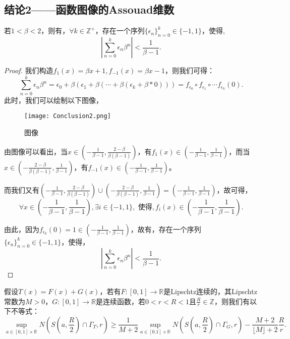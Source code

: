 \subsection{结论2——函数图像的Assouad维数}

\begin{lemma}
      若$1<\beta<2$，则有，$\forall k\in\mathbb{Z}^+$，存在一个序列$\{\epsilon_n\}_{n=0}^k\in\{-1,1\}$，使得,
      $$
            |\sum_{n=0}^k\epsilon_n\beta^n|<\frac{1}{\beta-1}.
      $$
\end{lemma}

\begin{proof}
      我们构造$f_1(x)=\beta x+1,f_{-1}(x)=\beta x -1$，则我们可得：
      $$
            \sum_{n=0}^k\epsilon_n\beta^n=\epsilon_0+\beta(\epsilon_1+\beta(\cdots+\beta(\epsilon_k+\beta*0)))=f_{\epsilon_0}\circ f_{\epsilon_1}\circ \cdots f_{\epsilon_k}(0).
      $$
      此时，我们可以绘制以下图像，
      \begin{figure*}[htbp]
            \centering
            \texttt{[image: Conclusion2.png]}
            \caption{图像}
            \label{fig:C1onclusion2}
      \end{figure*}

      由图像可以看出，当$x\in(-\frac{1}{\beta-1},\frac{2-\beta}{\beta(\beta-1)})$，有$f_1(x)\in(-\frac{1}{\beta-1},\frac{1}{\beta-1})$，而当$x\in(-\frac{2-\beta}{\beta(\beta-1)},\frac{1}{\beta-1})$，有$f_{-1}(x)\in(-\frac{1}{\beta-1},\frac{1}{\beta-1})$。

      而我们又有$(-\frac{1}{\beta-1},\frac{2-\beta}{\beta(\beta-1)})\cup(-\frac{2-\beta}{\beta(\beta-1)},\frac{1}{\beta-1})=(-\frac{1}{\beta-1},\frac{1}{\beta-1})$，故可得，
      $$
            \forall x\in(-\frac{1}{\beta-1},\frac{1}{\beta-1}), \exists i\in\{-1,1\},\mbox{ 使得},f_i(x)\in(-\frac{1}{\beta-1},\frac{1}{\beta-1}).
      $$

      由此，因为$f_{\epsilon_k}(0)=1\in(-\frac{1}{\beta-1},\frac{1}{\beta-1})$，故有，存在一个序列$\{\epsilon_n\}_{n=0}^{k}\in\{-1,1\}$，使得，
      $$
            |\sum_{n=0}^k\epsilon_n\beta^n|<\frac{1}{\beta-1}.
      $$
\end{proof}

\begin{lemma}
      假设$T(x)=F(x)+G(x)$，若有$F:[0,1]\rightarrow\mathbb{R}$是Lipschtz连续的，其Lipschtz常数为$M>0$，$G:[0,1]\rightarrow\mathbb{R}$是连续函数，若$0<r<R<1$且$\frac{R}{r}\in\mathbb{Z}$，则我们有以下不等式：
      $$
                  \underset{a\in[0,1]\times\mathbb{R}}{\sup} N(S(a,\frac{R}{2})\cap\Gamma_T,r)
                  \ge\frac{1}{M+2} \underset{a\in[0.1]\times\mathbb{R}}{\sup}N(S(a,\frac{R}{2})\cap\Gamma_G,r)-\frac{M+2}{\lfloor M\rfloor+2}\frac{R}{r}.
      $$
\end{lemma}

